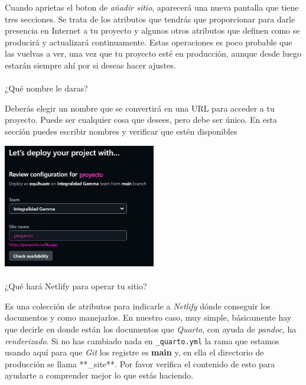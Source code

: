\documentclass[
  letterpaper,
  DIV=11,
  numbers=noendperiod]{scrartcl}
\makeatletter
\let\oldparagraph\paragraph
\renewcommand{\paragraph}{
    \@ifstar
      \xxxParagraphStar
      \xxxParagraphNoStar
  }
\newcommand{\xxxParagraphStar}[1]{\oldparagraph*{#1}\mbox{}}
\newcommand{\xxxParagraphNoStar}[1]{\oldparagraph{#1}\mbox{}}
\makeatother
\begin{document}
Cuando aprietas el boton de \emph{añadir sitio}, aparecerá una nueva
pantalla que tiene tres secciones. Se trata de los atributos que tendrás
que proporcionar para darle presencia en Internet a tu proyecto y
algunos otros atributos que definen como se producirá y actualizará
continuamente. Estas operaciones es poco probable que las vuelvas a ver,
una vez que tu proyecto esté en producción, aunque desde luego estarán
siempre ahí por si deseas hacer ajustes.

\paragraph{¿Qué nombre le daras?}\label{quuxe9-nombre-le-daras}

Deberás elegir un nombre que se convertirá en una URL para acceder a tu
proyecto. Puede ser cualquier cosa que desees, pero debe ser único. En
esta sección puedes escribir nombres y verificar que estén disponibles

\includegraphics[width=0.5\textwidth,height=\textheight]{images/Netlify-config-site-1.png}

\paragraph{¿Qué hará Netlify para operar tu
sitio?}\label{quuxe9-haruxe1-netlify-para-operar-tu-sitio}

Es una colección de atributos para indicarle a \emph{Netlify} dónde
conseguir los documentos y como manejarlos. En nuestro caso, muy simple,
básicamente hay que decirle en donde están los documentos que
\emph{Quarto}, con ayuda de \emph{pandoc}, ha \emph{renderizado}. Si no
has cambiado nada en \texttt{\_quarto.yml} la rama que estamos usando
aquí para que \emph{Git} los registre es \textbf{main} y, en ella el
directorio de producción se llama **\_site**. Por favor verifica el
contenido de esto para ayudarte a comprender mejor lo que estás
haciendo.
\end{document}

